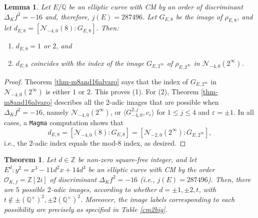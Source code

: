 \documentclass[11pt]{amsart}
\newtheorem{lemma}[defn]{Lemma}
\newtheorem{theorem}[defn]{Theorem}
\theoremstyle{definition}
\newcommand{\Q}{\mathbb Q}
\newcommand{\Z}{\mathbb Z}
\newcommand{\Of}{\mathcal{O}_{K,f}}
\begin{document}
\begin{lemma}\label{lem-disc16index}
    Let $E/\Q$ be an elliptic curve with CM by an order of discriminant  $\Delta_K f^2 = -16$ and, therefore, $j(E)=287496$. Let $G_{E,8}$ be the image of $\rho_{E,8}$, and let $d_{E,8}=[\mathcal{N}_{-4,0}(8):G_{E,8}]$. Then:
    \begin{enumerate}
        \item $d_{E,8}=1$ or $2$, and
        \item $d_{E,8}$ coincides with the index of the image $G_{E,2^\infty}$ of $\rho_{E,2^\infty}$ in $\mathcal{N}_{-4,0}(2^{\infty})$.
    \end{enumerate}
\end{lemma}
\begin{proof}
  Theorem \ref{thm-m8and16alvaro} says that the index of $G_{E, 2^{\infty}}$ in $\mathcal{N}_{-4,0}(2^{\infty})$ is either $1$ or $2$. This proves (1). For (2), Theorem \ref{thm-m8and16alvaro} describes all the $2$-adic images that are possible when $\Delta_K f^2=-16$, namely $\mathcal{N}_{-4,0}(2^{\infty})$, or $\langle G_{-4,0}^{2,j},c_\varepsilon \rangle$ for $1\leq j \leq 4$ and $\varepsilon=\pm 1$. In all cases, a \verb|Magma| computation shows that 
    $$d_{E,8}=[\mathcal{N}_{-4,0}(8):G_{E,8}]=[\mathcal{N}_{-2,0}(2^{\infty}):G_{E,2^\infty}],$$ i.e., the $2$-adic index equals the mod-$8$ index, as desired.
\end{proof}

\begin{theorem}\label{disc8ell2-ver}\label{thm-16ell2} Let $d\in \Z$ be non-zero square-free integer, and let $E^d:y^2=x^3 - 11 d^2x + 14d^3$ be an elliptic curve with CM by the order $\Of=\Z[2i]$ of discriminant $\Delta_K f^2=-16$ (i.e., $j(E)=287496$). Then, there are $5$ possible $2$-adic images, according to whether $d = \pm 1, \pm 2, t$, with $t \notin \pm (\Q^\times)^2, \pm 2(\Q^\times)^2$. Moreover, the image labels corresponding to each possibility are precisely as specified in Table \ref{cm2big}.
\end{theorem}
\end{document}
